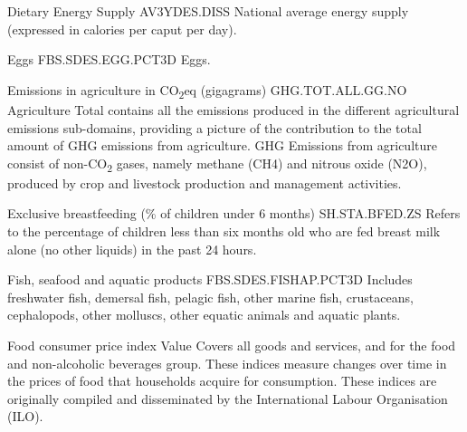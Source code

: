 \begin{MetadataCollection}
\begin{metadata}{ Dietary Energy Supply  }{ AV3YDES.DISS }
National average energy supply (expressed in calories per caput per day).  
\end{metadata}

\begin{metadata}{ Eggs }{ FBS.SDES.EGG.PCT3D }
Eggs. 
\end{metadata}

\begin{metadata}{ Emissions in agriculture in CO\textsubscript{2}eq (gigagrams) }{ GHG.TOT.ALL.GG.NO }
Agriculture Total contains all the emissions produced in the different agricultural emissions sub-domains, providing a picture of the contribution to the total amount of GHG emissions from agriculture. GHG Emissions from agriculture consist of non-CO\textsubscript{2} gases, namely methane (CH4) and nitrous oxide (N2O), produced by crop and livestock production and management activities. 
\end{metadata}

\begin{metadata}{ Exclusive breastfeeding (\% of children under 6 months) }{ SH.STA.BFED.ZS }
Refers to the percentage of children less than six months old who are fed breast milk alone (no other liquids) in the past 24 hours. 
\end{metadata}

\begin{metadata}{ Fish, seafood and aquatic products }{ FBS.SDES.FISHAP.PCT3D }
Includes freshwater fish, demersal fish, pelagic fish, other marine fish, crustaceans, cephalopods, other molluscs, other equatic animals and aquatic plants.  
\end{metadata}

\begin{metadata}{ Food consumer price index }{ Value }
Covers all goods and services, and for the food and non-alcoholic beverages group. These indices measure changes over time in the prices of food that households acquire for consumption. These indices are originally compiled and disseminated by the International Labour Organisation (ILO). 
\end{metadata}


\end{MetadataCollection}
